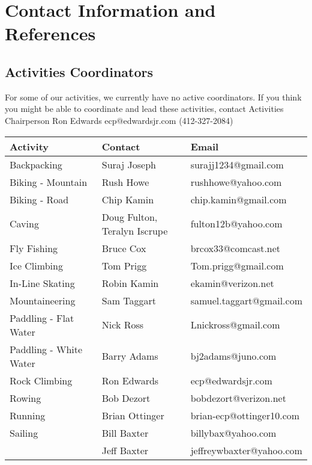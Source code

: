 \documentclass[10pt,a4paper]{article}
\begin{document}
\pagebreak
\clearpage

\appendix

\section{Contact Information and References}

\subsection{Activities Coordinators}
For some of our activities, we currently have no active coordinators. If you think you might be able to coordinate
and lead these activities, contact Activities Chairperson Ron Edwards ecp@edwardsjr.com (412-327-2084)


\begin{center}
    \begin{tabular}{ | l | l | l | }
    \hline
    \textbf{Activity} & \textbf{Contact} & \textbf{Email} \\\hline
	Backpacking & Suraj Joseph & surajj1234@gmail.com \\ \hline
	Biking - Mountain & Rush Howe & rushhowe@yahoo.com \\ \hline
	Biking - Road & Chip Kamin & chip.kamin@gmail.com \\ \hline
    Caving  & Doug Fulton, Teralyn Iscrupe & fulton12b@yahoo.com\\ \hline
    Fly Fishing & Bruce Cox & brcox33@comcast.net\\ \hline
    Ice Climbing & Tom Prigg & Tom.prigg@gmail.com\\ \hline
    In-Line Skating & Robin Kamin & ekamin@verizon.net\\ \hline
    Mountaineering & Sam Taggart & samuel.taggart@gmail.com\\ \hline
    Paddling - Flat Water & Nick Ross & Lnickross@gmail.com\\ \hline
    Paddling - White Water & Barry Adams & bj2adams@juno.com\\ \hline
    Rock Climbing & Ron Edwards & ecp@edwardsjr.com\\ \hline
    Rowing & Bob Dezort & bobdezort@verizon.net\\ \hline
    Running & Brian Ottinger &  brian-ecp@ottinger10.com\\ \hline
    Sailing & Bill Baxter & billybax@yahoo.com\\ \hline
		   &  Jeff Baxter& jeffreywbaxter@yahoo.com\\ \hline

\end{tabular}
\end{center}
\end{document}
